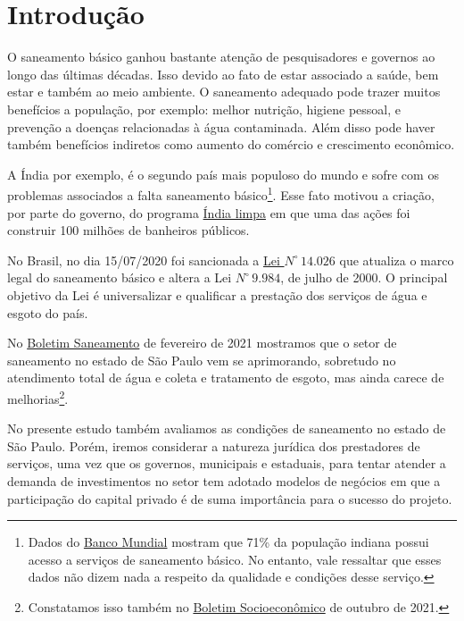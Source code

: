 
\section{Introdução}

\begin{multicols}{2}

O saneamento básico ganhou bastante atenção de pesquisadores e governos ao longo das últimas décadas. Isso devido ao fato de estar associado a saúde, bem estar e também ao meio ambiente. O saneamento adequado pode trazer muitos benefícios a população, por exemplo: melhor nutrição, higiene pessoal, e prevenção a doenças relacionadas à água contaminada. Além disso pode haver também benefícios indiretos como aumento do comércio e crescimento econômico.

A Índia por exemplo, é o segundo país mais populoso do mundo e sofre com os problemas associados a falta saneamento básico\footnote{
Dados do \href{https://data.worldbank.org/indicator/SH.STA.BASS.ZS?locations=IN}{Banco Mundial} mostram que 71\% da população indiana possui acesso a serviços de saneamento básico. No entanto, vale ressaltar que esses dados não dizem nada a respeito da qualidade e condições desse serviço.
}. Esse fato motivou a criação, por parte do governo, do programa \href{https://siwi.org/latest/the-clean-india-mission-worlds-largest-sanitation-initiative/}{Índia limpa} em que uma das ações foi construir 100 milhões de banheiros públicos.


No Brasil, no dia 15/07/2020 foi sancionada a \href{http://www.planalto.gov.br/ccivil_03/_ato2019-2022/2020/lei/l14026.htm}{Lei $N^\circ \, 14.026$} que atualiza o marco legal do saneamento básico e altera a Lei $N^\circ \, 9.984$, de julho de 2000. O principal objetivo da Lei é universalizar e qualificar a prestação dos serviços de água e esgoto do país. 

No \href{https://www.fundace.org.br/assets/uploads/_up_ceper_estudos/ceper_20210_00035.pdf}{Boletim Saneamento} de fevereiro de 2021 mostramos que o setor de saneamento no estado de São Paulo vem se aprimorando, sobretudo no
atendimento total de água e coleta e tratamento de esgoto, mas ainda carece de melhorias\footnote{Constatamos isso também no \href{https://www.fundace.org.br/assets/uploads/_up_ceper_estudos/ceper_20210_00039.pdf}{Boletim Socioeconômico} de outubro de 2021.}. 

No presente estudo também avaliamos as condições de saneamento no estado de São Paulo. Porém, iremos considerar a natureza jurídica dos prestadores de serviços, uma vez que os governos, municipais e estaduais, para tentar atender a demanda de investimentos no setor tem adotado modelos de negócios em que a participação do capital privado é de suma importância para o sucesso do projeto.


\end{multicols}
